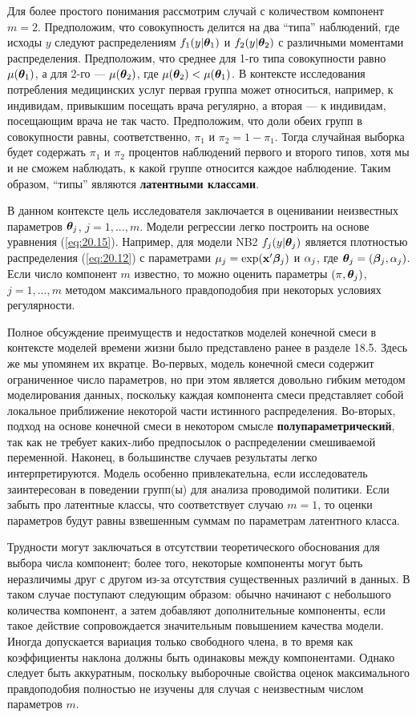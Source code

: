 Для более простого понимания рассмотрим случай с количеством компонент $m = 2$. Предположим, что совокупность делится на два ``типа'' наблюдений, где исходы $y$ следуют распределениям $f_1 (y|\bm{\theta}_1)$ и $f_2 (y|\bm{\theta}_2)$ с различными моментами распределения. Предположим, что среднее для 1-го типа совокупности равно $\mu(\bm{\theta}_1)$, а для 2-го --- $\mu(\bm{\theta}_2)$, где $\mu(\bm{\theta}_2) < \mu(\bm{\theta}_1)$. В контексте исследования потребления медицинских услуг первая группа может относиться, например, к индивидам, привыкшим посещать врача регулярно, а вторая --- к индивидам, посещающим врача не так часто. Предположим, что доли обеих групп в совокупности равны, соответственно, $\pi_1$ и $\pi_2 = 1 - \pi_1$. Тогда случайная выборка будет содержать $\pi_1$ и $\pi_2$ процентов наблюдений первого и второго типов, хотя мы и не сможем наблюдать, к какой группе относится каждое наблюдение. Таким образом, ``типы'' являются \textbf{латентными классами}.

В данном контексте цель исследователя заключается в оценивании неизвестных параметров $\bm{\theta}_j$, $j = 1, ..., m$. Модели регрессии легко построить на основе уравнения (\ref{eq:20.15}). Например, для модели NB2 $f_j(y|\bm{\theta}_j)$ является плотностью распределения (\ref{eq:20.12}) с параметрами $\mu_j = \exp(\mathbf{x}'\bm{\beta}_j)$ и $\alpha_j$, где $\bm{\theta}_j = (\bm{\beta}_j, \alpha_j)$. Если число компонент $m$ известно, то можно оценить параметры $(\pi, \bm{\theta}_j)$, $j = 1, ..., m$ методом максимального правдоподобия при некоторых условиях регулярности.

Полное обсуждение преимуществ и недостатков моделей конечной смеси в контексте моделей времени жизни было представлено ранее в разделе 18.5. Здесь же мы упомянем их вкратце. Во-первых, модель конечной смеси содержит ограниченное число параметров, но при этом является довольно гибким методом моделирования данных, поскольку каждая компонента смеси представляет собой локальное приближение некоторой части истинного распределения. Во-вторых, подход на основе конечной смеси в некотором смысле \textbf{полупараметрический}, так как не требует каких-либо предпосылок о распределении смешиваемой переменной. Наконец, в большинстве случаев результаты легко интерпретируются. Модель особенно привлекательна, если исследователь заинтересован в поведении групп(ы) для анализа проводимой политики. Если забыть про латентные классы, что соответствует случаю $m = 1$, то оценки параметров будут равны взвешенным суммам по параметрам латентного класса.

Трудности могут заключаться в отсутствии теоретического обоснования для выбора числа компонент; более того, некоторые компоненты могут быть неразличимы друг с другом из-за отсутствия существенных различий в данных. В таком случае поступают следующим образом: обычно начинают с небольшого количества компонент, а затем добавляют дополнительные компоненты, если такое действие сопровождается значительным повышением качества модели. Иногда допускается вариация только свободного члена, в то время как коэффициенты наклона должны быть одинаковы между компонентами. Однако следует быть аккуратным, поскольку выборочные свойства оценок максимального правдоподобия полностью не изучены для случая с неизвестным числом параметров $m$.

